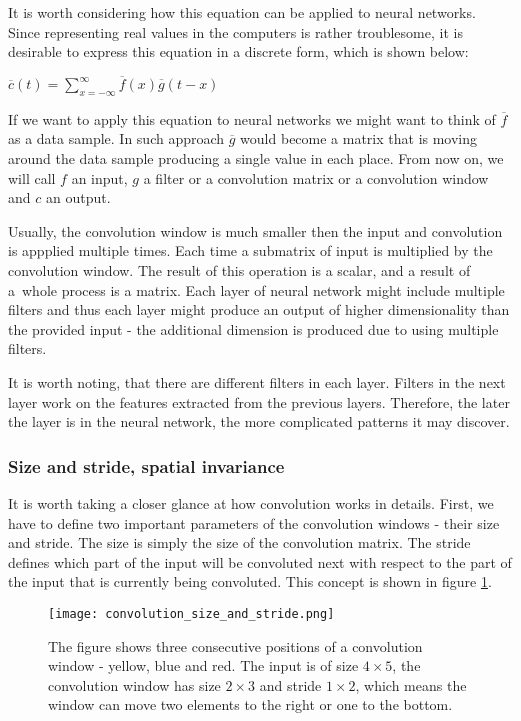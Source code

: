 \documentclass[a4paper,10pt]{report}
\begin{document}
	  It is worth considering how this equation can be applied to neural networks. Since representing real values in the computers is rather troublesome, it is desirable to express this equation in a discrete form, which is shown below: 
	  \begin{center}
	  $\overline{c}(t) = \sum\limits_{x = -\infty}^\infty \overline{f}(x)\overline{g}(t-x)$  
	  \end{center}
	  
	  If we want to apply this equation to neural networks we might want to think of $\overline{f}$ as a data sample. In such approach $\overline{g}$ would become a matrix that is moving around the data sample producing a single value in each place. From now on, we will call $f$ an input, $g$ a filter or a convolution matrix or a convolution window and $c$ an output. 
	  
	  Usually, the convolution window is much smaller then the input and convolution is appplied multiple times. Each time a  submatrix of input is multiplied by the convolution window. The result of this operation is a scalar, and a result of a~whole process is a matrix. Each layer of neural network might include multiple filters and thus each layer might produce an output of higher dimensionality than the provided input - the additional dimension is produced due to using multiple filters. 
	  
	  It is worth noting, that there are different filters in each layer. Filters in the next layer work on the features extracted from the previous layers. Therefore, the later the layer is in the neural network, the more complicated patterns it may discover. 
	  
	  \subsubsection{Size and stride, spatial invariance}
	  
	  It is worth taking a closer glance at how convolution works in details. First, we have to define two important parameters of the convolution windows - their size and stride. The size is simply the size of the convolution matrix. The stride defines which part of the input will be convoluted next with respect to the part of the input that is currently being convoluted. This concept is shown in figure \ref{fig:convolution_size_and_stride}. 
	  
	  
	  \begin{figure}[h!]
	    \centering
	    \texttt{[image: convolution\_size\_and\_stride.png]}
	    \caption{The figure shows three consecutive positions of a convolution window - yellow, blue and red. The input is of size $4\times5$, the convolution window has size $2\times3$ and stride $1\times2$, which means the window can move two elements to the right or one to the bottom.}
	    \label{fig:convolution_size_and_stride}
	  \end{figure} 
	  
\end{document}
